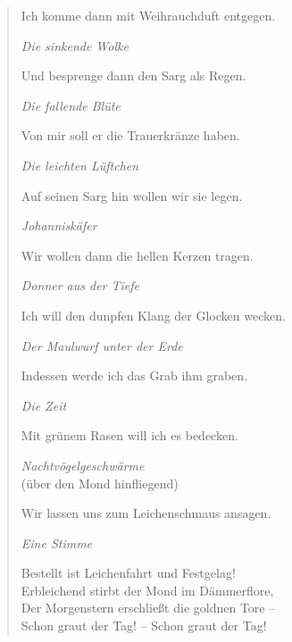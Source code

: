 \begin{verse}
Ich komme dann mit Weihrauchduft entgegen.

\smallskip

\textit{Die sinkende Wolke}

\smallskip

Und besprenge dann den Sarg als Regen.

\smallskip

\textit{Die fallende Blüte}

\smallskip

Von mir soll er die Trauerkränze haben.

\smallskip

\textit{Die leichten Lüftchen}

\smallskip

Auf seinen Sarg hin wollen wir sie legen.

\smallskip

\textit{Johanniskäfer}

\smallskip

Wir wollen dann die hellen Kerzen tragen.

\smallskip

\textit{Donner aus der Tiefe}

\smallskip

Ich will den dunpfen Klang der Glocken wecken.

\smallskip

\textit{Der Maulwurf unter der Erde}

\smallskip

Indessen werde ich das Grab ihm graben.

\smallskip

\textit{Die Zeit}

\smallskip

Mit grünem Rasen will ich es bedecken.

\smallskip

\textit{Nachtvögelgeschwärme} \\
(über den Mond hinfliegend)

\smallskip

Wir lassen uns zum Leichenschmaus ansagen.

\smallskip

\textit{Eine Stimme}

\smallskip

Bestellt ist Leichenfahrt und Festgelag! \\
Erbleichend stirbt der Mond im Dämmerflore, \\
Der Morgenstern erschließt die goldnen Tore -- \\
Schon graut der Tag! -- Schon graut der Tag!


\end{verse}
